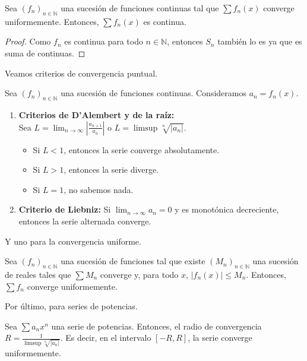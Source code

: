 \begin{proposition}
	Sea $(f_n)_{n \in \mathbb{N}}$ una sucesión de funciones continuas tal que $\sum f_n(x)$ converge uniformemente. Entonces, $\sum f_n(x)$ es continua.
\end{proposition}

\begin{proof}
	Como $f_n$ es continua para todo $n \in \mathbb{N}$, entonces $S_n$ también lo es ya que es suma de continuas.
\end{proof}

Veamos criterios de convergencia puntual.

\begin{proposition}
	Sea $(f_n)_{n \in \mathbb{N}}$ una sucesión de funciones continuas. Consideramos $a_n = f_n(x)$.
	\begin{enumerate}
		\item \textbf{Criterios de D'Alembert y de la raíz:} \\Sea $L = \lim_{n \to \infty} \left\lvert \frac{a_{n+1}}{a_n} \right\rvert$ o $L = \limsup \sqrt[n]{\left\lvert a_n \right\rvert}$.
		      \begin{itemize}
			      \item Si $L < 1$, entonces la serie converge absolutamente.
			      \item Si $L > 1$, entonces la serie diverge.
			      \item Si $L = 1$, no sabemos nada.
		      \end{itemize}

		\item \textbf{Criterio de Liebniz:} Si $\lim_{n \to \infty} a_n = 0$ y es monotónica decreciente, entonces la serie alternada converge.
	\end{enumerate}
\end{proposition}


Y uno para la convergencia uniforme.

\begin{proposition}
	Sea $(f_n)_{n \in \mathbb{N}}$ una sucesión de funciones tal que existe $(M_n)_{n \in \mathbb{N}}$ una sucesión de reales tales que $\sum M_n$ converge y, para todo $x$, $\left\lvert f_n(x) \right\rvert \leq M_n$. Entonces, $\sum f_n$ converge uniformemente.
\end{proposition}

Por último, para series de potencias.

\begin{proposition}
	Sea $\sum a_n x^n$ una serie de potencias. Entonces, el radio de convergencia $R = \frac{1}{\limsup \sqrt[n]{\left\lvert a_n \right\rvert}}$. Es decir, en el intervalo $[-R, R]$, la serie converge uniformemente.
\end{proposition}



